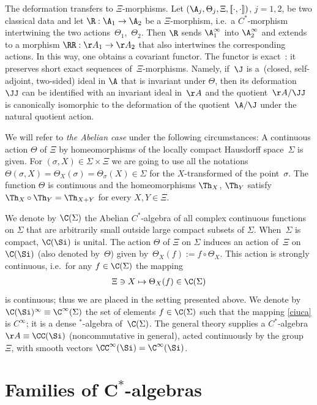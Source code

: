 The deformation transfers to $\Xi$-morphisms. Let
$\left(\A_j,\Theta_j,\Xi,[\![\cdot,\cdot]\!]\right)$, $j=1,2$, be two classical data and
let $\R:\A_1\to\A_2$ be a $\Xi$-morphism, i.e.\ a $C^*$-morphism intertwining the
two actions~$\Theta_1$,~$\Theta_2$. Then $\R$ sends $\A^\infty_1$ into $\A^\infty_2$ and extends to a morphism
$\RR:\AA_1\to\AA_2$ that also intertwines the corresponding actions. In this way, one obtains a
covariant functor.
The functor is exact~\cite{Rie1}: it preserves short exact sequences of~$\Xi$-morphisms. Namely, if~$\J$ is a~(closed,
self-adjoint, two-sided) ideal in $\A$ that is invariant under $\Theta$, then its deformation $\JJ$ can be
identif\/ied with an invariant ideal in~$\AA$ and the quotient~$\AA/\JJ$ is canonically isomorphic to the
deformation  of the quotient~$\A/\J$  under the natural quotient action.

We will refer to {\it the Abelian case} under the following circumstances:
A continuous action $\Theta$ of $\Xi$ by homeomorphisms of the locally compact Hausdorf\/f space~$\Sigma$ is given. For
$(\sigma,X)\in\Sigma\times\Xi$ we are going to use all the notations
$\Theta(\sigma,X)=\Theta_X(\sigma)=\Theta_\sigma(X)\in\Sigma$ for the $X$-transformed of the point~$\sigma$.
The function $\Theta$ is continuous and the homeomorphisms
$\Th_X$, $\Th_Y$ satisfy $\Th_X\circ\Th_Y=\Th_{X+Y}$ for every $X,Y\in\Xi$.

We denote by $\C(\Sigma)$ the Abelian $C^*$-algebra of all complex continuous functions on $\Sigma$
that are arbitrarily small outside large compact subsets of $\Sigma$. When~$\Sigma$ is compact,
$\C(\Si)$ is unital. The action $\Theta$ of $\Xi$ on $\Sigma$ induces an action of~$\Xi$ on
$\C(\Si)$ (also denoted by~$\Theta$) given by~$\Theta_X(f):=f\circ\Theta_X$.
This action is strongly continuous, i.e.\ for any $f\in\C(\Sigma)$ the mapping
\begin{gather}\label{ciuca}
\Xi\ni X\mapsto\Theta_X(f)\in\C(\Sigma)
\end{gather}
is continuous; thus we are placed in the setting presented above.
We denote by $\C(\Si)^\infty\equiv\C^\infty(\Sigma)$ the set of elements $f\in\C(\Sigma)$ such that the
mapping \eqref{ciuca} is $C^\infty$; it is a dense $^*$-algebra of~$\C(\Sigma)$.
The general theory supplies a $C^*$-algebra $\AA\equiv\CC(\Si)$ (noncommutative in general),
acted continuously by the group~$\Xi$, with
smooth vectors $\CC^\infty(\Si)=\C^\infty(\Si)$.


\section[Families of $C^*$-algebras]{Families of $\boldsymbol{C^*}$-algebras}\label{secintra}

